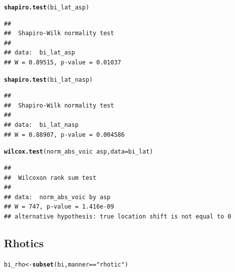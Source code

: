 \documentclass[a4paper,11pt]{article}\usepackage[]{graphicx}\usepackage[]{color}
\makeatletter
\newcommand{\hlstr}[1]{\textcolor[rgb]{0.192,0.494,0.8}{#1}}%
\newcommand{\hlopt}[1]{\textcolor[rgb]{0,0,0}{#1}}%
\newcommand{\hlstd}[1]{\textcolor[rgb]{0.345,0.345,0.345}{#1}}%
\newcommand{\hlkwb}[1]{\textcolor[rgb]{0.69,0.353,0.396}{#1}}%
\newcommand{\hlkwc}[1]{\textcolor[rgb]{0.333,0.667,0.333}{#1}}%
\newcommand{\hlkwd}[1]{\textcolor[rgb]{0.737,0.353,0.396}{\textbf{#1}}}%
\newenvironment{kframe}{%
 \def\at@end@of@kframe{}%
 \ifinner\ifhmode%
  \def\at@end@of@kframe{\end{minipage}}%
  \begin{minipage}{\columnwidth}%
 \fi\fi%
 \def\FrameCommand##1{\hskip\@totalleftmargin \hskip-\fboxsep
 \colorbox{shadecolor}{##1}\hskip-\fboxsep
     \hskip-\linewidth \hskip-\@totalleftmargin \hskip\columnwidth}%
 \MakeFramed {\advance\hsize-\width
   \@totalleftmargin\z@ \linewidth\hsize
   \@setminipage}}%
 {\par\unskip\endMakeFramed%
 \at@end@of@kframe}
\newenvironment{knitrout}{}{} %
\makeatother
\begin{document}
\begin{knitrout}
\color{fgcolor}\begin{kframe}
\begin{alltt}
\hlkwd{shapiro.test}\hlstd{(bi_lat_asp)}
\end{alltt}
\begin{verbatim}
## 
## 	Shapiro-Wilk normality test
## 
## data:  bi_lat_asp
## W = 0.89515, p-value = 0.01037
\end{verbatim}
\begin{alltt}
\hlkwd{shapiro.test}\hlstd{(bi_lat_nasp)}
\end{alltt}
\begin{verbatim}
## 
## 	Shapiro-Wilk normality test
## 
## data:  bi_lat_nasp
## W = 0.88907, p-value = 0.004586
\end{verbatim}
\begin{alltt}
\hlkwd{wilcox.test}\hlstd{(norm_abs_voic} \hlopt{~} \hlstd{asp,} \hlkwc{data} \hlstd{= bi_lat)}
\end{alltt}
\begin{verbatim}
## 
## 	Wilcoxon rank sum test
## 
## data:  norm_abs_voic by asp
## W = 747, p-value = 1.416e-09
## alternative hypothesis: true location shift is not equal to 0
\end{verbatim}
\end{kframe}
\end{knitrout}

\subsection{Rhotics}

\begin{knitrout}
\color{fgcolor}\begin{kframe}
\begin{alltt}
\hlstd{bi_rho} \hlkwb{<-} \hlkwd{subset}\hlstd{(bi, manner} \hlopt{==} \hlstr{"rhotic"}\hlstd{)}
\end{alltt}
\end{kframe}
\end{knitrout}
\end{document}
